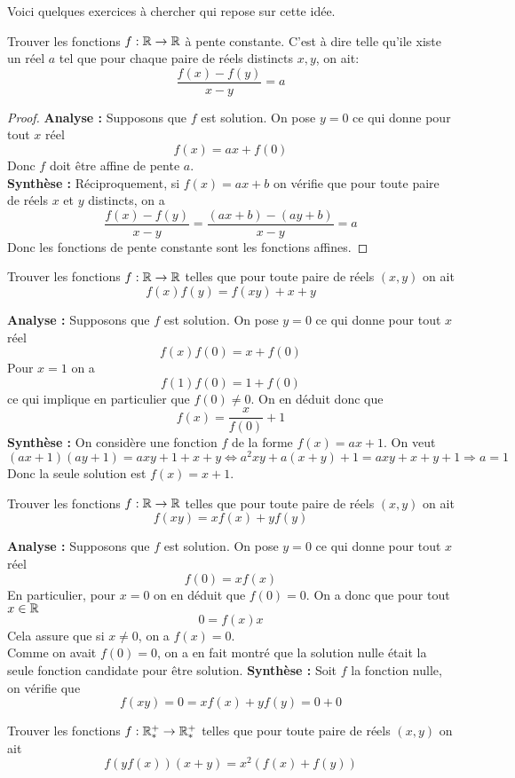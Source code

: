 Voici quelques exercices à chercher qui repose sur cette idée.
\begin{exo}[F]
Trouver les fonctions $f:\mathbb R\to \mathbb R$ à pente constante. C'est à dire telle qu'ile xiste un réel $a$ tel que pour chaque paire de réels distincts $x,y$, on ait:
$$\frac{f(x)-f(y)}{x-y}=a $$
\end{exo}

\begin{proof}
\textbf{Analyse :} Supposons que $f$ est solution. On pose $y=0$ ce qui donne pour tout $x$ réel
$$f(x)=ax+f(0) $$
Donc $f$ doit être affine de pente $a$.
\\
\textbf{Synthèse :} Réciproquement, si $f(x)=ax+b$ on vérifie que pour toute paire de réels $x$ et $y$ distincts, on a
$$\frac{f(x)-f(y)}{x-y}=\frac{(ax+b)-(ay+b)}{x-y}=a $$
Donc les fonctions de pente constante sont les fonctions affines.
\end{proof}
\begin{exo}[F]
Trouver les fonctions $f:\mathbb R\to \mathbb R$ telles que pour toute paire de réels $(x,y)$ on ait
$$f(x)f(y)=f(xy)+x+y $$
\end{exo}
\begin{preuve}
\textbf{Analyse :} Supposons que $f$ est solution. On pose $y=0$ ce qui donne pour tout $x$ réel
$$f(x)f(0)=x+f(0) $$
Pour $x=1$ on a
$$f(1)f(0)=1+f(0) $$ ce qui implique en particulier que $f(0)\neq 0$. On en déduit donc que
$$f(x)=\frac{x}{f(0)}+1 $$
\textbf{Synthèse :} On considère une fonction $f$ de la forme $f(x)=ax+1$. On veut
$$(ax+1)(ay+1)=axy+1+x+y\iff a^2xy+a(x+y)+1=axy+x+y+1\Rightarrow a=1 $$
Donc la seule solution est $f(x)=x+1$.
\end{preuve}
\begin{exo}[F]
Trouver les fonctions $f:\mathbb R\to \mathbb R$ telles que pour toute paire de réels $(x,y)$ on ait
$$f(xy)=xf(x)+yf(y) $$

\end{exo}
\begin{preuve}
\textbf{Analyse :} Supposons que $f$ est solution. On pose $y=0$ ce qui donne pour tout $x$ réel
$$f(0)=xf(x) $$
En particulier, pour $x=0$ on en déduit que $f(0)=0$. On a donc que pour tout $x\in \mathbb R$
$$0=f(x)x $$ Cela assure que si $x\neq 0$, on a $f(x)=0$.
\\
Comme on avait $f(0)=0$, on a en fait montré que la solution nulle était la seule fonction candidate pour être solution.
\textbf{Synthèse :} Soit $f$ la fonction nulle, on vérifie que
$$f(xy)=0=xf(x)+yf(y)=0+0 $$
\end{preuve}
\begin{exo}[M]
Trouver les fonctions $f:\mathbb R_*^+\to \mathbb R_*^+$ telles que pour toute paire de réels $(x,y)$ on ait
$$f(yf(x))(x+y)=x^2(f(x)+f(y)) $$

\end{exo}
